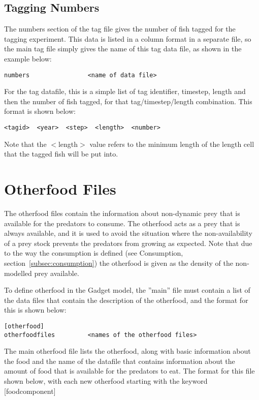 \documentclass [a4paper, 10pt]{book}
\begin{document}
\section{Tagging Numbers}\label{sec:tagnumbers}
The numbers section of the tag file gives the number of fish tagged for the tagging experiment.  This data is listed in a column format in a separate file, so the main tag file simply gives the name of this tag data file, as shown in the example below:

{\small\begin{verbatim}
numbers                <name of data file>
\end{verbatim}}

For the tag datafile, this is a simple list of tag identifier, timestep, length and then the number of fish tagged, for that tag/timestep/length combination.  This format is shown below:

{\small\begin{verbatim}
<tagid>  <year>  <step>  <length>  <number>
\end{verbatim}}

Note that the $<$length$>$ value refers to the minimum length of the length cell that the tagged fish will be put into.

\chapter{Otherfood Files}\label{chap:other}
The otherfood files contain the information about non-dynamic prey that is available for the predators to consume.  The otherfood acts as a prey that is always available, and it is used to avoid the situation where the non-availability of a prey stock prevents the predators from growing as expected.  Note that due to the way the consumption is defined (see Consumption, section~\ref{subsec:consumption}) the otherfood is given as the density of the non-modelled prey available.

\bigskip
To define otherfood in the Gadget model, the ''main'' file must contain a list of the data files that contain the description of the otherfood, and the format for this is shown below:

{\small\begin{verbatim}
[otherfood]
otherfoodfiles         <names of the otherfood files>
\end{verbatim}}

The main otherfood file lists the otherfood, along with basic information about the food and the name of the datafile that contains information about the amount of food that is available for the predators to eat.  The format for this file shown below, with each new otherfood starting with the keyword [foodcomponent]
\end{document}
